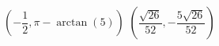 { $\left( -\dfrac{1}{2}, \pi - \arctan\left(5\right)  \right)$ }
{ $\left( \dfrac{\sqrt{26}}{52}, -\dfrac{5\sqrt{26}}{52} \right)$ }
